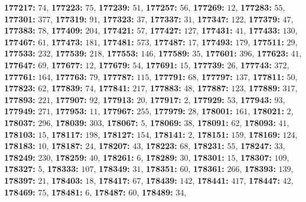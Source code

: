 \textsf{\bfseries 177217:} $74$, \textsf{\bfseries 177223:} $75$, \textsf{\bfseries 177239:} $51$, \textsf{\bfseries 177257:} $56$, \textsf{\bfseries 177269:} $12$, \textsf{\bfseries 177283:} $55$, \textsf{\bfseries 177301:} $377$, \textsf{\bfseries 177319:} $91$, \textsf{\bfseries 177323:} $37$, \textsf{\bfseries 177337:} $31$, \textsf{\bfseries 177347:} $122$, \textsf{\bfseries 177379:} $47$, \textsf{\bfseries 177383:} $78$, \textsf{\bfseries 177409:} $204$, \textsf{\bfseries 177421:} $57$, \textsf{\bfseries 177427:} $127$, \textsf{\bfseries 177431:} $41$, \textsf{\bfseries 177433:} $130$, \textsf{\bfseries 177467:} $61$, \textsf{\bfseries 177473:} $181$, \textsf{\bfseries 177481:} $573$, \textsf{\bfseries 177487:} $17$, \textsf{\bfseries 177493:} $179$, \textsf{\bfseries 177511:} $29$, \textsf{\bfseries 177533:} $232$, \textsf{\bfseries 177539:} $218$, \textsf{\bfseries 177553:} $146$, \textsf{\bfseries 177589:} $35$, \textsf{\bfseries 177601:} $396$, \textsf{\bfseries 177623:} $41$, \textsf{\bfseries 177647:} $69$, \textsf{\bfseries 177677:} $12$, \textsf{\bfseries 177679:} $54$, \textsf{\bfseries 177691:} $15$, \textsf{\bfseries 177739:} $26$, \textsf{\bfseries 177743:} $372$, \textsf{\bfseries 177761:} $164$, \textsf{\bfseries 177763:} $79$, \textsf{\bfseries 177787:} $115$, \textsf{\bfseries 177791:} $68$, \textsf{\bfseries 177797:} $137$, \textsf{\bfseries 177811:} $50$, \textsf{\bfseries 177823:} $62$, \textsf{\bfseries 177839:} $74$, \textsf{\bfseries 177841:} $217$, \textsf{\bfseries 177883:} $48$, \textsf{\bfseries 177887:} $123$, \textsf{\bfseries 177889:} $317$, \textsf{\bfseries 177893:} $221$, \textsf{\bfseries 177907:} $92$, \textsf{\bfseries 177913:} $20$, \textsf{\bfseries 177917:} $2$, \textsf{\bfseries 177929:} $53$, \textsf{\bfseries 177943:} $93$, \textsf{\bfseries 177949:} $271$, \textsf{\bfseries 177953:} $11$, \textsf{\bfseries 177967:} $255$, \textsf{\bfseries 177979:} $28$, \textsf{\bfseries 178001:} $161$, \textsf{\bfseries 178021:} $2$, \textsf{\bfseries 178037:} $296$, \textsf{\bfseries 178039:} $303$, \textsf{\bfseries 178067:} $5$, \textsf{\bfseries 178069:} $38$, \textsf{\bfseries 178091:} $62$, \textsf{\bfseries 178093:} $41$, \textsf{\bfseries 178103:} $15$, \textsf{\bfseries 178117:} $198$, \textsf{\bfseries 178127:} $154$, \textsf{\bfseries 178141:} $2$, \textsf{\bfseries 178151:} $159$, \textsf{\bfseries 178169:} $124$, \textsf{\bfseries 178183:} $10$, \textsf{\bfseries 178187:} $24$, \textsf{\bfseries 178207:} $43$, \textsf{\bfseries 178223:} $68$, \textsf{\bfseries 178231:} $55$, \textsf{\bfseries 178247:} $33$, \textsf{\bfseries 178249:} $230$, \textsf{\bfseries 178259:} $40$, \textsf{\bfseries 178261:} $6$, \textsf{\bfseries 178289:} $30$, \textsf{\bfseries 178301:} $15$, \textsf{\bfseries 178307:} $109$, \textsf{\bfseries 178327:} $5$, \textsf{\bfseries 178333:} $107$, \textsf{\bfseries 178349:} $31$, \textsf{\bfseries 178351:} $60$, \textsf{\bfseries 178361:} $266$, \textsf{\bfseries 178393:} $139$, \textsf{\bfseries 178397:} $21$, \textsf{\bfseries 178403:} $18$, \textsf{\bfseries 178417:} $67$, \textsf{\bfseries 178439:} $142$, \textsf{\bfseries 178441:} $417$, \textsf{\bfseries 178447:} $42$, \textsf{\bfseries 178469:} $75$, \textsf{\bfseries 178481:} $6$, \textsf{\bfseries 178487:} $60$, \textsf{\bfseries 178489:} $34$, 
